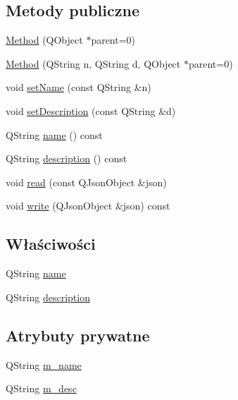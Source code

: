 \subsection*{Metody publiczne}
\begin{DoxyCompactItemize}
\item 
\hyperlink{class_method_aa3a7f4470828bcc05b78467d0e840a04}{Method} (Q\-Object $\ast$parent=0)
\item 
\hyperlink{class_method_a44942be54e782afc4a11e444c6a1735c}{Method} (Q\-String n, Q\-String d, Q\-Object $\ast$parent=0)
\item 
void \hyperlink{class_method_a4e8375fe026ed07964e8ff0671ed2446}{set\-Name} (const Q\-String \&n)
\item 
void \hyperlink{class_method_a5e911cf889152d5f6ed5ff24c9091364}{set\-Description} (const Q\-String \&d)
\item 
Q\-String \hyperlink{class_method_a4f22c1375bd806b6a5c55570143251b8}{name} () const 
\item 
Q\-String \hyperlink{class_method_a2d9d9d004a0fc9d152066ac2728f354c}{description} () const 
\item 
void \hyperlink{class_method_a7fb905d9402518987d08e2d6e5227d88}{read} (const Q\-Json\-Object \&json)
\item 
void \hyperlink{class_method_a706689fe25b5ed85f9b1480d78574bb7}{write} (Q\-Json\-Object \&json) const 
\end{DoxyCompactItemize}
\subsection*{Właściwości}
\begin{DoxyCompactItemize}
\item 
Q\-String \hyperlink{class_method_a9131d3ff2cd50747c50290986126aff3}{name}
\item 
Q\-String \hyperlink{class_method_ab9629abfec31f98ae690c575d48ccfe7}{description}
\end{DoxyCompactItemize}
\subsection*{Atrybuty prywatne}
\begin{DoxyCompactItemize}
\item 
Q\-String \hyperlink{class_method_a9d32898717bfff12b9935ce28466bfbb}{m\-\_\-name}
\item 
Q\-String \hyperlink{class_method_a1b82868cdbe5311123ea22b0cfb586ae}{m\-\_\-desc}
\end{DoxyCompactItemize}

